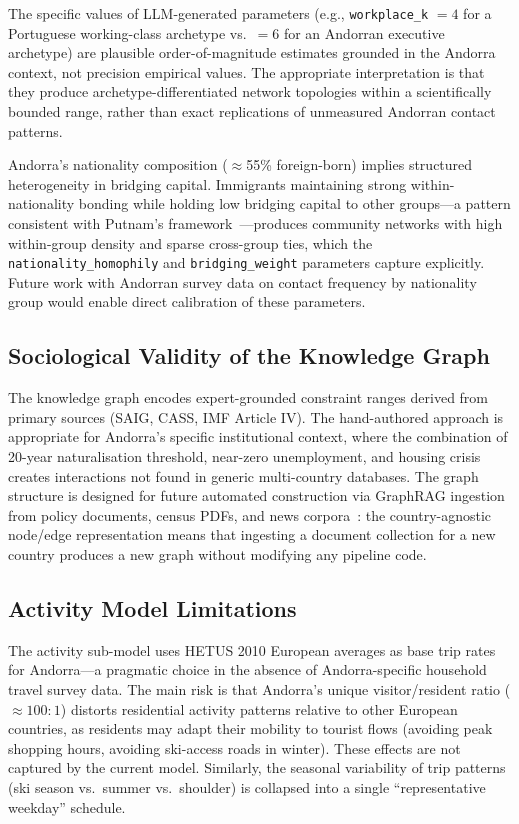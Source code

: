 \documentclass[a4paper,12pt]{article}
\begin{document}
The specific values of LLM-generated parameters (e.g., \texttt{workplace\_k}
$= 4$ for a Portuguese working-class archetype vs.\ $= 6$ for an Andorran
executive archetype) are plausible order-of-magnitude estimates grounded in
the Andorra context, not precision empirical values. The appropriate
interpretation is that they produce archetype-differentiated network topologies
within a scientifically bounded range, rather than exact replications of
unmeasured Andorran contact patterns.

Andorra's nationality composition ($\approx$55\% foreign-born) implies
structured heterogeneity in bridging capital. Immigrants maintaining strong
within-nationality bonding while holding low bridging capital to other
groups---a pattern consistent with Putnam's
framework~\cite{putnam2000bowling}---produces community networks with high
within-group density and sparse cross-group ties, which the
\texttt{nationality\_homophily} and \texttt{bridging\_weight} parameters
capture explicitly. Future work with Andorran survey data on contact frequency
by nationality group would enable direct calibration of these parameters.

\subsection{Sociological Validity of the Knowledge Graph}
\label{subsec:kg_validity}

The knowledge graph encodes expert-grounded constraint ranges derived from
primary sources (SAIG, CASS, IMF Article IV). The hand-authored approach
is appropriate for Andorra's specific institutional context, where the
combination of 20-year naturalisation threshold, near-zero unemployment,
and housing crisis creates interactions not found in generic multi-country
databases. The graph structure is designed for future automated construction
via GraphRAG ingestion from policy documents, census PDFs, and news
corpora~\cite{pan2023unifying}: the country-agnostic node/edge representation
means that ingesting a document collection for a new country produces a
new graph without modifying any pipeline code.

\subsection{Activity Model Limitations}
\label{subsec:activity_limitations}

The activity sub-model uses HETUS 2010 European averages as base trip
rates for Andorra---a pragmatic choice in the absence of Andorra-specific
household travel survey data. The main risk is that Andorra's unique
visitor/resident ratio ($\approx 100:1$) distorts residential activity
patterns relative to other European countries, as residents may adapt
their mobility to tourist flows (avoiding peak shopping hours, avoiding
ski-access roads in winter). These effects are not captured by the current
model. Similarly, the seasonal variability of trip patterns (ski season
vs.\ summer vs.\ shoulder) is collapsed into a single ``representative
weekday'' schedule.
\end{document}
